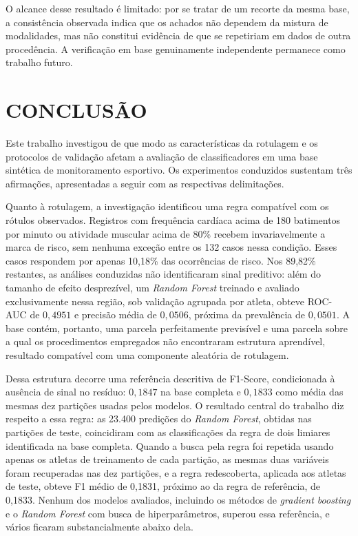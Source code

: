 O alcance desse resultado é limitado: por se tratar de um recorte da mesma base, a consistência observada indica que os achados não dependem da mistura de modalidades, mas não constitui evidência de que se repetiriam em dados de outra procedência. A verificação em base genuinamente independente permanece como trabalho futuro.

\chapter{CONCLUSÃO}

Este trabalho investigou de que modo as características da rotulagem e os protocolos de validação afetam a avaliação de classificadores em uma base sintética de monitoramento esportivo. Os experimentos conduzidos sustentam três afirmações, apresentadas a seguir com as respectivas delimitações.

Quanto à rotulagem, a investigação identificou uma regra compatível com os rótulos observados. Registros com frequência cardíaca acima de 180 batimentos por minuto ou atividade muscular acima de 80\% recebem invariavelmente a marca de risco, sem nenhuma exceção entre os 132 casos nessa condição. Esses casos respondem por apenas 10{,}18\% das ocorrências de risco. Nos 89{,}82\% restantes, as análises conduzidas não identificaram sinal preditivo: além do tamanho de efeito desprezível, um \textit{Random Forest} treinado e avaliado exclusivamente nessa região, sob validação agrupada por atleta, obteve ROC-AUC de $0{,}4951$ e precisão média de $0{,}0506$, próxima da prevalência de $0{,}0501$. A base contém, portanto, uma parcela perfeitamente previsível e uma parcela sobre a qual os procedimentos empregados não encontraram estrutura aprendível, resultado compatível com uma componente aleatória de rotulagem.

Dessa estrutura decorre uma referência descritiva de F1-Score, condicionada à ausência de sinal no resíduo: $0{,}1847$ na base completa e $0{,}1833$ como média das mesmas dez partições usadas pelos modelos. O resultado central do trabalho diz respeito a essa regra: as 23.400 predições do \textit{Random Forest}, obtidas nas partições de teste, coincidiram com as classificações da regra de dois limiares identificada na base completa. Quando a busca pela regra foi repetida usando apenas os atletas de treinamento de cada partição, as mesmas duas variáveis foram recuperadas nas dez partições, e a regra redescoberta, aplicada aos atletas de teste, obteve F1 médio de 0{,}1831, próximo ao da regra de referência, de 0{,}1833. Nenhum dos modelos avaliados, incluindo os métodos de \textit{gradient boosting} e o \textit{Random Forest} com busca de hiperparâmetros, superou essa referência, e vários ficaram substancialmente abaixo dela.

